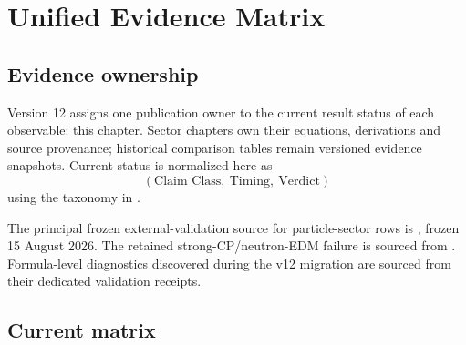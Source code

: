 \documentclass[11pt,a4paper,twoside]{book}
\theoremstyle{definition}
\begin{document}
\clearpage

\chapter{Unified Evidence Matrix}
\label{ch:v12_evidence_matrix}

\section{Evidence ownership}

Version 12 assigns one publication owner to the current result status of each observable: this chapter. Sector chapters own their equations, derivations and source provenance; historical comparison tables remain versioned evidence snapshots. Current status is normalized here as
\[
\boxed{(\text{Claim Class},\ \text{Timing},\ \text{Verdict})}
\]
using the taxonomy in .

The principal frozen external-validation source for particle-sector rows is
, frozen 15 August 2026. The retained strong-CP/neutron-EDM failure is sourced from . Formula-level diagnostics discovered during the v12 migration are sourced from their dedicated validation receipts.

\section{Current matrix}
\end{document}
